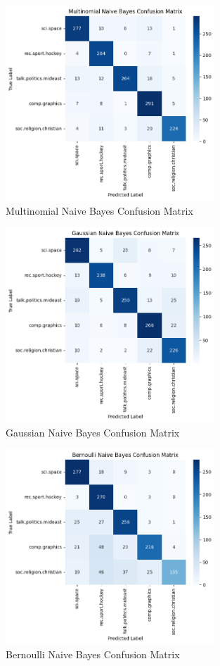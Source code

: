 \documentclass[a4paper,12pt]{article}
\begin{document}
\begin{figure}[H]
    \centering
    \includegraphics[width=0.7\textwidth]{Q2_1.png}
    \caption{Multinomial Naive Bayes Confusion Matrix}
\end{figure}

\begin{figure}[H]
    \centering
    \includegraphics[width=0.7\textwidth]{Q2_2.png}
    \caption{Gaussian Naive Bayes Confusion Matrix}
\end{figure}

\begin{figure}[H]
    \centering
    \includegraphics[width=0.7\textwidth]{Q2_3.png}
    \caption{Bernoulli Naive Bayes Confusion Matrix}
\end{figure}
\end{document}
